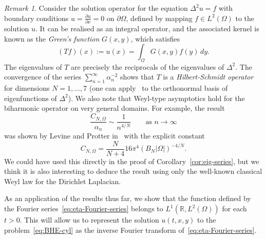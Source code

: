 \documentclass[a4paper, reqno,titlepage]{amsart}
\numberwithin{equation}{section}
\theoremstyle{plain}
\theoremstyle{definition}
\theoremstyle{remark}
\newtheorem{remark}[theorem]{Remark}
\newcommand{\RR}{\mathbb{R}}
\begin{document}
\begin{remark}
  Consider the solution operator for the equation $\Delta^2 u = f$ with boundary conditions $u = \frac{\partial u}{\partial \nu} = 0$ on $\partial\Omega$, defined by mapping $f \in L^2(\Omega)$ to the solution $u$. It can be realised as an integral operator, and the associated kernel is known as the \emph{Green's function} $G(x,y)$, which satisfies
  \begin{equation*}
    (Tf)(x) := u(x) = \int_\Omega G(x,y)f(y) \,dy.
  \end{equation*}
  The eigenvalues of $T$ are precisely the reciprocals of the eigenvalues of $\Delta^2$. The convergence of the series $\sum_{n=1}^\infty \alpha_n^{-2}$ shows that $T$ is a \emph{Hilbert-Schmidt operator} for dimensions $N=1,\ldots,7$ (one can apply~\cite[Theorem 4.5]{Hal} to the orthonormal basis of eigenfunctions of $\Delta^2$). We also note that Weyl-type asymptotics hold for the biharmonic operator on very general domains. For example, the result
  \begin{equation}
    \frac{C_{N,\Omega}}{\alpha_n} \sim \frac{1}{n^{4/N}} \qquad \text{as } n \to \infty
  \end{equation}
  was shown by Levine and Protter in~\cite{LP} with the explicit constant
  \begin{equation*}
    C_{N,\Omega} = \frac{N}{N+4} 16\pi^4 (B_N|\Omega|)^{-4/N}.
  \end{equation*}
  We could have used this directly in the proof of Corollary~\ref{cor:eig-series}, but we think it is also interesting to deduce the result using only the well-known classical Weyl law for the Dirichlet Laplacian.
\end{remark}

As an application of the results thus far, we show that the function defined by the Fourier series~\eqref{eq:eta-Fourier-series} belongs to $L^1(\RR, L^2(\Omega))$ for each $t > 0$. This will allow us to represent the solution $u(t,x,y)$ to the problem~\eqref{eq:BHE-cyl} as the inverse Fourier transform of~\eqref{eq:eta-Fourier-series}.
\end{document}
